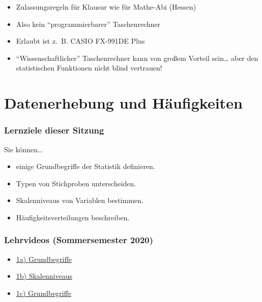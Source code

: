 \documentclass[
  11pt,
  ngerman,
  a4paper,
]{report}
\providecommand{\tightlist}{%
  \setlength{\itemsep}{0pt}\setlength{\parskip}{0pt}}
\begin{document}
\begin{itemize}
\tightlist
\item
  Zulassungsregeln für Klausur wie für Mathe-Abi (Hessen)
\item
  Also kein \enquote{programmierbarer} Taschenrechner
\item
  Erlaubt ist z.~B. CASIO FX-991DE Plus
\item
  \enquote{Wissenschaftlicher} Taschenrechner kann von großem Vorteil sein\ldots{} aber den statistischen Funktionen nicht blind vertrauen!
\end{itemize}

\hypertarget{datenerhebung-und-huxe4ufigkeiten}{%
\chapter{Datenerhebung und Häufigkeiten}\label{datenerhebung-und-huxe4ufigkeiten}}

\hypertarget{lernziele-dieser-sitzung}{%
\subsection*{Lernziele dieser Sitzung}\label{lernziele-dieser-sitzung}}

Sie können\ldots{}

\begin{itemize}
\tightlist
\item
  einige Grundbegriffe der Statistik definieren.
\item
  Typen von Stichproben unterscheiden.
\item
  Skalenniveaus von Variablen bestimmen.
\item
  Häufigkeitsverteilungen beschreiben.
\end{itemize}

\hypertarget{lehrvideos-sommersemester-2020}{%
\subsection*{Lehrvideos (Sommersemester 2020)}\label{lehrvideos-sommersemester-2020}}

\begin{itemize}
\tightlist
\item
  \href{https://video01.uni-frankfurt.de/Mediasite/Play/36dca452df154bd3b7be2e069174e8991d}{1a) Grundbegriffe}
\item
  \href{https://video01.uni-frankfurt.de/Mediasite/Play/5a397035f7a6468fa2cecf802ca8d52a1d}{1b) Skalenniveaus}
\item
  \href{https://video01.uni-frankfurt.de/Mediasite/Play/5fce0458009b4da283b14fdc30e3a0ea1d}{1c) Grundbegriffe}
\end{itemize}
\end{document}
